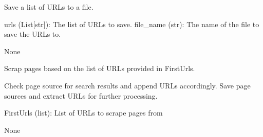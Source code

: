 \documentclass[letterpaper,10pt,english]{sphinxmanual}
\begin{document}

\begin{fulllineitems}
\label{\detokenize{Project.Script:Project.Script.RecupKbPaloAlto.save_urls}}
\pysigstartsignatures
{}
\pysigstopsignatures
\sphinxAtStartPar
Save a list of URLs to a file.
\begin{description}
\sphinxAtStartPar
urls (List{[}str{]}): The list of URLs to save.
file\_name (str): The name of the file to save the URLs to.

\sphinxAtStartPar
None

\end{description}

\end{fulllineitems}


\begin{fulllineitems}
\label{\detokenize{Project.Script:Project.Script.RecupKbPaloAlto.scrapPages}}
\pysigstartsignatures
{}
\pysigstopsignatures
\sphinxAtStartPar
Scrap pages based on the list of URLs provided in FirstUrls.

\sphinxAtStartPar
Check page source for search results and append URLs accordingly.
Save page sources and extract URLs for further processing.
\begin{description}
\sphinxAtStartPar
FirstUrls (list): List of URLs to scrape pages from

\sphinxAtStartPar
None

\end{description}

\end{fulllineitems}
\end{document}
